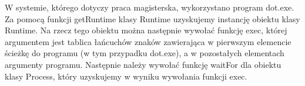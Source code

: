 W systemie, którego dotyczy praca magisterska, wykorzystano program dot.exe. Za pomocą funkcji getRuntime klasy Runtime uzyskujemy instancję obiektu klasy Runtime. Na rzecz tego obiektu można następnie wywołać funkcję exec, której argumentem jest tablica łańcuchów znaków zawierająca w pierwszym elemencie ścieżkę do programu (w tym przypadku dot.exe), a w pozostałych elementach argumenty programu. Następnie należy wywołać funkcję waitFor dla obiektu klasy Process, który uzyskujemy w wyniku wywołania funkcji exec.
